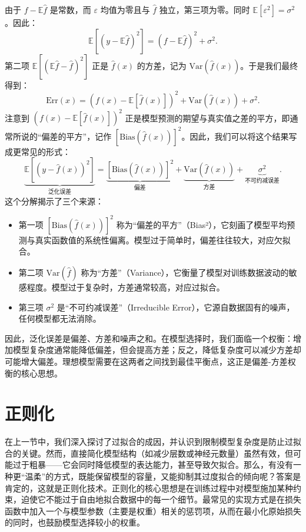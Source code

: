 \documentclass[lang=cn,zihao=-4,a4paper,fontset=windows]{beautybook}
\begin{document}
由于 \(f - \mathbb{E}\hat{f}\) 是常数，而 \(\varepsilon\) 均值为零且与 \(\hat{f}\) 独立，第三项为零。同时 \(\mathbb{E}[\varepsilon^2] = \sigma^2\)。因此：
\[
\mathbb{E}[(y - \mathbb{E}\hat{f})^2] = (f - \mathbb{E}\hat{f})^2 + \sigma^2.
\]
第二项 \(\mathbb{E}[(\mathbb{E}\hat{f} - \hat{f})^2]\) 正是 \(\hat{f}(x)\) 的方差，记为 \(\text{Var}(\hat{f}(x))\)。于是我们最终得到：
\[
\text{Err}(x) = (f(x) - \mathbb{E}[\hat{f}(x)])^2 + \text{Var}(\hat{f}(x)) + \sigma^2.
\]
注意到 \((f(x) - \mathbb{E}[\hat{f}(x)])^2\) 正是模型预测的期望与真实值之差的平方，即通常所说的“偏差的平方”，记作 \([\text{Bias}(\hat{f}(x))]^2\)。因此，我们可以将这个结果写成更常见的形式：
\[
\underbrace{\mathbb{E}[(y - \hat{f}(x))^2]}_{\text{泛化误差}} = \underbrace{[\text{Bias}(\hat{f}(x))]^2}_{\text{偏差}} + \underbrace{\text{Var}(\hat{f}(x))}_{\text{方差}} + \underbrace{\sigma^2}_{\text{不可约减误差}}.
\]
这个分解揭示了三个来源：
\begin{itemize}
\item 第一项 \([\text{Bias}(\hat{f}(x))]^2\) 称为“偏差的平方”（Bias²），它刻画了模型平均预测与真实函数值的系统性偏离。模型过于简单时，偏差往往较大，对应欠拟合。
\item 第二项 \(\text{Var}(\hat{f})\) 称为“方差”（Variance），它衡量了模型对训练数据波动的敏感程度。模型过于复杂时，方差通常较高，对应过拟合。
\item 第三项 \(\sigma^2\) 是“不可约减误差”（Irreducible Error），它源自数据固有的噪声，任何模型都无法消除。
\end{itemize}

因此，泛化误差是偏差、方差和噪声之和。在模型选择时，我们面临一个权衡：增加模型复杂度通常能降低偏差，但会提高方差；反之，降低复杂度可以减少方差却可能增大偏差。理想模型需要在这两者之间找到最佳平衡点，这正是偏差-方差权衡的核心思想。

\section{正则化}

在上一节中，我们深入探讨了过拟合的成因，并认识到限制模型复杂度是防止过拟合的关键。然而，直接简化模型结构（如减少层数或神经元数量）虽然有效，但可能过于粗暴——它会同时降低模型的表达能力，甚至导致欠拟合。那么，有没有一种更“温柔”的方式，既能保留模型的容量，又能抑制其过度拟合的倾向呢？答案是肯定的，这就是正则化技术。正则化的核心思想是在训练过程中对模型施加某种约束，迫使它不能过于自由地拟合数据中的每一个细节。最常见的实现方式是在损失函数中加入一个与模型参数（主要是权重）相关的惩罚项，从而在最小化原始损失的同时，也鼓励模型选择较小的权重。
\end{document}
